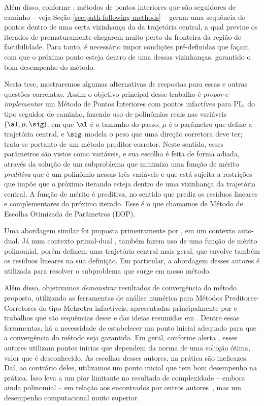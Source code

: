 Além disso, conforme \textcite{Hung:1996br}, métodos de pontos interiores que são seguidores de caminho  -- veja Seção \ref{sec:path-following-methods} --  geram uma sequência de pontos dentro de uma certa vizinhança da da trajetória central, a qual previne os iterados de prematuramente chegarem muito perto da fronteira da região de factibilidade. Para tanto, é necessário impor condições pré-definidas que façam com que o próximo ponto esteja dentro de uma dessas vizinhanças, garantido  o bom desempenho do método. 




Nesta tese, mostraremos algumas alternativas de respostas para  essas e outras questões correlatas. Assim o objetivo principal desse trabalho é \emph{propor} e \emph{implementar} um Método de Pontos Interiores com pontos infactíves para \ac{PL}, do tipo seguidor de caminho, fazendo  uso de polinômios reais nas variáveis $(\al,\mu,\sig)$, em que $\al$ é o tamanho do passo, $\mu$ é o parâmetro que define a trajetória central, e $\sig$ modela o peso que uma direção corretora deve ter; trata-se portanto de um método preditor-corretor. Neste sentido, esses parâmetros são vistos como variáveis, e sua escolha é feita de forma adiada, através da solução de um subproblema que minimiza uma função de mérito \emph{preditiva} que é um polinômio nessas três variáveis e que está sujeita a restrições que impõe que o próximo iterando esteja dentro de uma vizinhança da trajetória central. A função de mérito é preditiva, no sentido que prediz os resíduos lineares e complementares do próximo iterado. Esse é  o que chamamos de Método de Escolha Otimizada de Parâmetros (EOP).


Uma abordagem similar foi proposta primeiramente por \textcite{VillasBoas:2003tg}, em um contexto auto-dual. Já num contexto primal-dual \textcite{VillasBoas:2012ur,VillasBoas2013:wn}, também fazem uso de uma função de mérito polinomial, porém definem uma trajetória central mais geral, que envolve também os resíduos lineares na sua definição.  Em particular, a abordagem desses autores é utilizada para resolver o subproblema que surge em nosso método.

Além disso, objetivamos \emph{demonstrar} resultados de convergência do método proposto, utilizando as ferramentas de análise numérica para Métodos Preditores-Corretores do tipo Mehrotra infactíveis, apresentadas principalmente por \textcite{Zhang:2006ic} e trabalhos que são sequências desse e das ideias resumidas em \textcite[cap. 7]{Wright:Primal-dual-interior-point:1997h}. Dentre essas ferramentas, há a necessidade de estabelecer um ponto inicial adequado para que a convergência do método seja garantida. Em geral, conforme alerta \textcite[p. 112]{Wright:Primal-dual-interior-point:1997h}, esses autores utilizam pontos inicias que dependem da norma de uma solução ótima, valor que é desconhecido. As escolhas desses autores, na prática são ineficazes. 
Daí, ao contrário deles, utilizamos um ponto inicial que tem bom desempenho na prática. Isso leva a um pior limitante no resultado de complexidade -- embora ainda polinomial -- em relação aos encontrados por outros autores~\cite{Zhang:1995fu,Zhang:2006ic,Wright:1993je,Wright:1996kj}, mas um desempenho computacional muito superior. 


